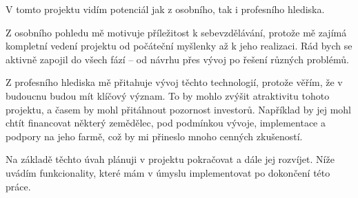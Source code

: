 V tomto projektu vidím potenciál jak z osobního, tak i profesního hlediska.

Z osobního pohledu mě motivuje příležitost k sebevzdělávání, protože mě zajímá kompletní vedení projektu od počáteční myšlenky až k jeho realizaci.
Rád bych se aktivně zapojil do všech fází – od návrhu přes vývoj po řešení různých problémů.

Z profesního hlediska mě přitahuje vývoj těchto technologií, protože věřím, že v budoucnu budou mít klíčový význam.
To by mohlo zvýšit atraktivitu tohoto projektu, a časem by mohl přitáhnout pozornost investorů.
Například by jej mohl chtít financovat některý zemědělec, pod  podmínkou vývoje, implementace a podpory na jeho farmě, což by mi přineslo mnoho cenných zkušeností.

Na základě těchto úvah plánuji v projektu pokračovat a dále jej rozvíjet.
Níže uvádím funkcionality, které mám v úmyslu implementovat po dokončení této práce.\newline



%